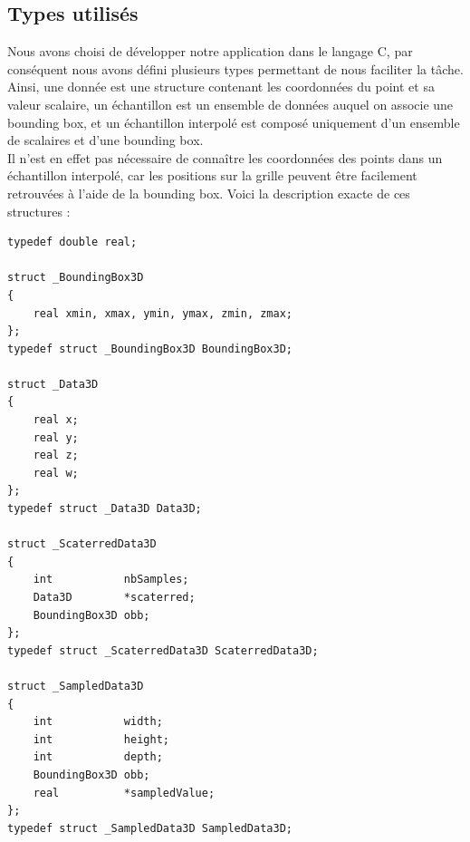 \documentclass[a4paper,9pt]{article}
\begin{document}
\subsection{Types utilisés}
\label{subsec:types}
Nous avons choisi de développer notre application dans le langage C, par conséquent nous avons défini plusieurs types permettant de nous faciliter la tâche. Ainsi, une donnée est une structure contenant les coordonnées du point et sa valeur scalaire, un échantillon est un ensemble de données auquel on associe une bounding box, et un échantillon interpolé est composé uniquement d'un ensemble de scalaires et d'une bounding box.\\Il n'est en effet pas nécessaire de connaître les coordonnées des points dans un échantillon interpolé, car les positions sur la grille peuvent être facilement retrouvées à l'aide de la bounding box. Voici la description exacte de ces structures :

\begin{verbatim}
typedef double real;

struct _BoundingBox3D
{
	real xmin, xmax, ymin, ymax, zmin, zmax;
};
typedef struct _BoundingBox3D BoundingBox3D;

struct _Data3D 
{
	real x;
	real y;
	real z;
	real w;
};
typedef struct _Data3D Data3D;

struct _ScaterredData3D
{
	int           nbSamples;
	Data3D        *scaterred;
	BoundingBox3D obb;
};
typedef struct _ScaterredData3D ScaterredData3D;

struct _SampledData3D
{
	int           width;
	int           height;
	int           depth;
	BoundingBox3D obb;
	real          *sampledValue;
};
typedef struct _SampledData3D SampledData3D;
\end{verbatim}
\end{document}
